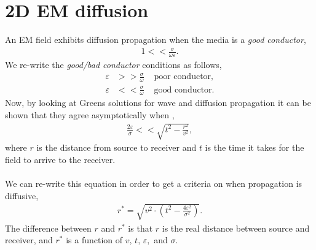 \documentclass[a4paper,12pt]{article}
\begin{document}
	\section*{2D EM diffusion}
	An EM field exhibits diffusion propagation when the media is a {\it good conductor},
	\begin{align}
		1 << \frac{\sigma}{\omega\varepsilon}.
	\end{align}
	We re-write the {\it good/bad conductor} conditions as follows,
	\begin{align}
		\varepsilon &>> \frac{\sigma}{\omega} &\text{ poor conductor},\\
		\varepsilon &<< \frac{\sigma}{\omega} &\text{ good conductor}.
	\end{align}
	Now, by looking at Greens solutions for wave and diffusion propagation it can be shown that they agree asymptotically when \cite[]{oristaglio1984diffusion},
	\begin{align}
		\frac{2\varepsilon}{\sigma} << \sqrt{t^2 - \frac{r^2}{v^2}},
	\end{align}
	where $r$ is the distance from source to receiver and $t$ is the time it takes for the field to arrive to the receiver.
	\\\\
	We can re-write this equation in order to get a criteria on when propagation is diffusive,
	\begin{align}
		r^* = \sqrt{v^2 \cdot \left(t^2 - \frac{4\varepsilon^2}{\sigma^2}\right)}.
	\end{align}
	The difference between $r$ and $r^*$ is that $r$ is the real distance between source and receiver, and $r^*$ is a function of $v,\,t,\,\varepsilon,$ and $\sigma$.
\end{document}

